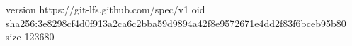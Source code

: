 version https://git-lfs.github.com/spec/v1
oid sha256:3e8298cf4d0f913a2ca6c2bba59d9894a42f8e9572671e4dd2f83f6bceb95b80
size 123680
